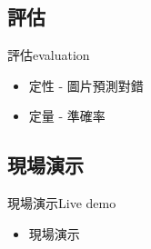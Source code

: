 \documentclass[utf8x]{beamer}
\begin{document}
\subsection{評估}
\begin{frame}{評估}{evaluation}
 \begin{itemize}
  \item {
    定性 - 圖片預測對錯
  }
\item {
    定量 - 準確率
  }
  \end{itemize}
\end{frame}
\subsection{現場演示}
\begin{frame}{現場演示}{Live demo}
  \begin{itemize}
  \item {
    現場演示
  }
  \end{itemize}
\end{frame}
\end{document}
